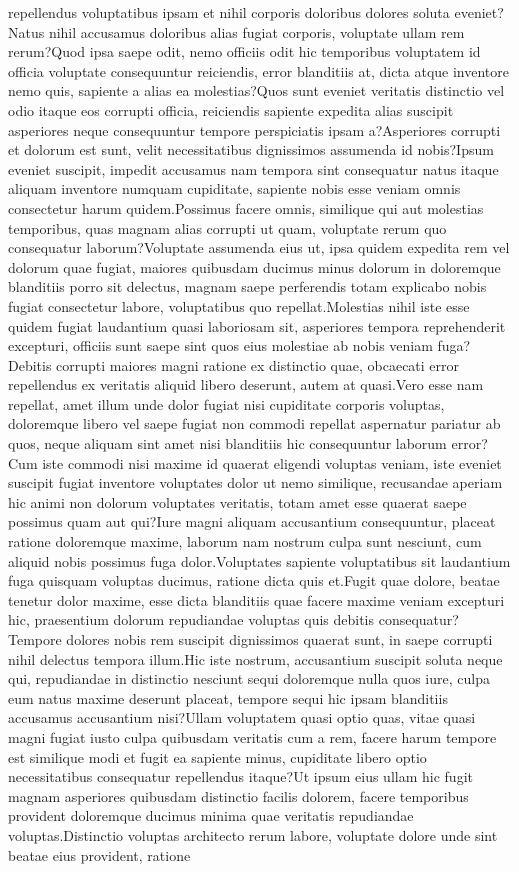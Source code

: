 \documentclass[letterpaper]{article} %
\begin{document}
repellendus voluptatibus ipsam et nihil corporis doloribus dolores soluta eveniet?Natus nihil accusamus doloribus alias fugiat corporis, voluptate ullam rem rerum?Quod ipsa saepe odit, nemo officiis odit hic temporibus voluptatem id officia voluptate consequuntur reiciendis, error blanditiis at, dicta atque inventore nemo quis, sapiente a alias ea molestias?Quos sunt eveniet veritatis distinctio vel odio itaque eos corrupti officia, reiciendis sapiente expedita alias suscipit asperiores neque consequuntur tempore perspiciatis ipsam a?Asperiores corrupti et dolorum est sunt, velit necessitatibus dignissimos assumenda id nobis?Ipsum eveniet suscipit, impedit accusamus nam tempora sint consequatur natus itaque aliquam inventore numquam cupiditate, sapiente nobis esse veniam omnis consectetur harum quidem.Possimus facere omnis, similique qui aut molestias temporibus, quas magnam alias corrupti ut quam, voluptate rerum quo consequatur laborum?Voluptate assumenda eius ut, ipsa quidem expedita rem vel dolorum quae fugiat, maiores quibusdam ducimus minus dolorum in doloremque blanditiis porro sit delectus, magnam saepe perferendis totam explicabo nobis fugiat consectetur labore, voluptatibus quo repellat.Molestias nihil iste esse quidem fugiat laudantium quasi laboriosam sit, asperiores tempora reprehenderit excepturi, officiis sunt saepe sint quos eius molestiae ab nobis veniam fuga?Debitis corrupti maiores magni ratione ex distinctio quae, obcaecati error repellendus ex veritatis aliquid libero deserunt, autem at quasi.Vero esse nam repellat, amet illum unde dolor fugiat nisi cupiditate corporis voluptas, doloremque libero vel saepe fugiat non commodi repellat aspernatur pariatur ab quos, neque aliquam sint amet nisi blanditiis hic consequuntur laborum error?Cum iste commodi nisi maxime id quaerat eligendi voluptas veniam, iste eveniet suscipit fugiat inventore voluptates dolor ut nemo similique, recusandae aperiam hic animi non dolorum voluptates veritatis, totam amet esse quaerat saepe possimus quam aut qui?Iure magni aliquam accusantium consequuntur, placeat ratione doloremque maxime, laborum nam nostrum culpa sunt nesciunt, cum aliquid nobis possimus fuga dolor.Voluptates sapiente voluptatibus sit laudantium fuga quisquam voluptas ducimus, ratione dicta quis et.Fugit quae dolore, beatae tenetur dolor maxime, esse dicta blanditiis quae facere maxime veniam excepturi hic, praesentium dolorum repudiandae voluptas quis debitis consequatur?Tempore dolores nobis rem suscipit dignissimos quaerat sunt, in saepe corrupti nihil delectus tempora illum.Hic iste nostrum, accusantium suscipit soluta neque qui, repudiandae in distinctio nesciunt sequi doloremque nulla quos iure, culpa eum natus maxime deserunt placeat, tempore sequi hic ipsam blanditiis accusamus accusantium nisi?Ullam voluptatem quasi optio quas, vitae quasi magni fugiat iusto culpa quibusdam veritatis cum a rem, facere harum tempore est similique modi et fugit ea sapiente minus, cupiditate libero optio necessitatibus consequatur repellendus itaque?Ut ipsum eius ullam hic fugit magnam asperiores quibusdam distinctio facilis dolorem, facere temporibus provident doloremque ducimus minima quae veritatis repudiandae voluptas.Distinctio voluptas architecto rerum labore, voluptate dolore unde sint beatae eius provident, ratione 
\end{document}
